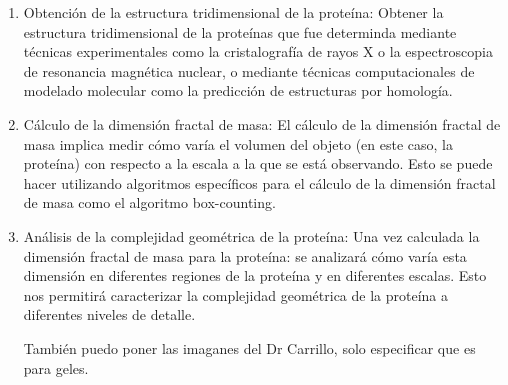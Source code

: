 \documentclass[11pt]{article}
\begin{document}
\begin{enumerate}
	
\item Obtención de la estructura tridimensional de la proteína: Obtener la estructura tridimensional de la proteínas que fue determinda mediante técnicas experimentales como la cristalografía de rayos X o la espectroscopia de resonancia magnética nuclear, o mediante técnicas computacionales de modelado molecular como la predicción de estructuras por homología.

\item Cálculo de la dimensión fractal de masa: El cálculo de la dimensión fractal de masa implica medir cómo varía el volumen del objeto (en este caso, la proteína) con respecto a la escala a la que se está observando. Esto se puede hacer utilizando algoritmos específicos para el cálculo de la dimensión fractal de masa como el algoritmo box-counting.

\item Análisis de la complejidad geométrica de la proteína: Una vez calculada la dimensión fractal de masa para la proteína: se analizará cómo varía esta dimensión en diferentes regiones de la proteína y en diferentes escalas. Esto nos permitirá caracterizar la complejidad geométrica de la proteína a diferentes niveles de detalle.

También puedo poner las imaganes del Dr Carrillo, solo especificar que es para geles. 

\end{enumerate}
\end{document}
